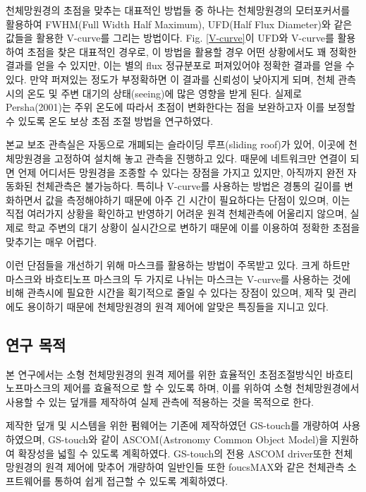 \documentclass[twoside,11pt]{gshs_thesis}
\begin{document}
천체망원경의 초점을 맞추는 대표적인 방법들 중 하나는 천체망원경의 모터포커서를 활용하여 FWHM(Full Width Half Maximum), UFD(Half Flux Diameter)와 같은 값들을 활용한 V-curve를 그리는 방법이다. Fig. \ref{V-curve}이 UFD와 V-curve를 활용하여 초점을 찾은 대표적인 경우로, 이 방법을 활용할 경우 어떤 상황에서도 꽤 정확한 결과를 얻을 수 있지만, 이는 별의 flux 정규분포로 퍼져있어야 정확한 결과를 얻을 수 있다. 만약 퍼져있는 정도가 부정확하면 이 결과를 신뢰성이 낮아지게 되며, 천체 관측시의 온도 및 주변 대기의 상태(seeing)에 많은 영향을 받게 된다. 실제로 Persha(2001)는 주위 온도에 따라서 초점이 변화한다는 점을 보완하고자 이를 보정할 수 있도록 온도 보상 초점 조절 방법을 연구하였다.\cite{persha2001temperature}


본교 보조 관측실은 자동으로 개폐되는 슬라이딩 루프(sliding roof)가 있어, 이곳에 천체망원경을 고정하여 설치해 놓고 관측을 진행하고 있다. 때문에 네트워크만 연결이 되면 언제 어디서든 망원경을 조종할 수 있다는 장점을 가지고 있지만, 아직까지 완전 자동화된 천체관측은 불가능하다. 특히나 V-curve를 사용하는 방법은 경통의 길이를 변화하면서 값을 측정해야하기 때문에 아주 긴 시간이 필요하다는 단점이 있으며, 이는 직접 여러가지 상황을 확인하고 반영하기 어려운 원격 천체관측에 어울리지 않으며, 실제로 학교 주변의 대기 상황이 실시간으로 변하기 때문에 이를 이용하여 정확한 초점을 맞추기는 매우 어렵다.


이런 단점들을 개선하기 위해 마스크를 활용하는 방법이 주목받고 있다. 크게 하트만 마스크와 바흐티노프 마스크의 두 가지로 나뉘는 마스크는 V-curve를 사용하는 것에 비해 관측시에 필요한 시간을 획기적으로 줄일 수 있다는 장점이 있으며, 제작 및 관리에도 용이하기 때문에 천체망원경의 원격 제어에 알맞은 특징들을 지니고 있다.





\subsection{연구 목적}

본 연구에서는 소형 천체망원경의 원격 제어를 위한 효율적인 초점조절방식인 바흐티노프마스크의 제어를 효율적으로 할 수 있도록 하며, 이를 위하여 소형 천체망원경에서 사용할 수 있는 덮개를 제작하여 실제 관측에 적용하는 것을 목적으로 한다. 

제작한 덮개 및 시스템을 위한 펌웨어는 기존에 제작하였던 GS-touch를 개량하여 사용하였으며, GS-touch와 같이 ASCOM(Astronomy Common Object Model)을 지원하여 확장성을 넓힐 수 있도록 계획하였다. GS-touch의 전용 ASCOM driver또한 천체망원경의 원격 제어에 맞추어 개량하여 일반인들 또한 foucsMAX와 같은 천체관측 소프트웨어를 통하여 쉽게 접근할 수 있도록 계획하였다.
\end{document}
